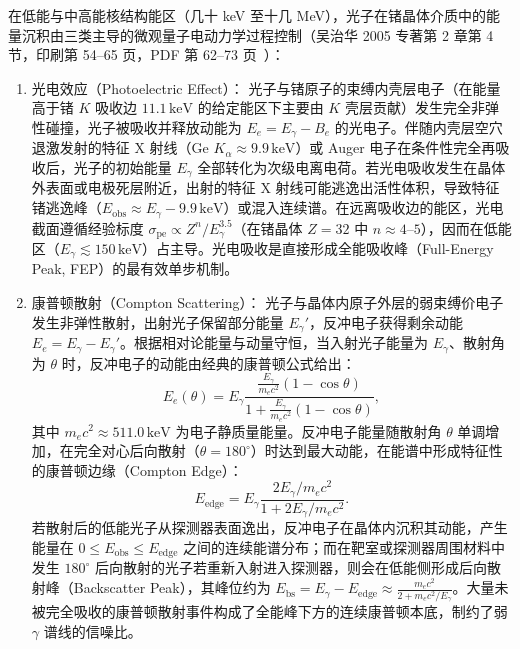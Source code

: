 在低能与中高能核结构能区（几十 keV 至十几 MeV），光子在锗晶体介质中的能量沉积由三类主导的微观量子电动力学过程控制（吴治华 2005 专著第 2 章第 4 节，印刷第 54–65 页，PDF 第 62–73 页~\cite{book-wu-nuclear-experiment-methods}）：
\begin{enumerate}
\item 光电效应（Photoelectric Effect）：
光子与锗原子的束缚内壳层电子（在能量高于锗 $K$ 吸收边 $11.1\,\text{keV}$ 的给定能区下主要由 $K$ 壳层贡献）发生完全非弹性碰撞，光子被吸收并释放动能为 $E_e = E_\gamma - B_e$ 的光电子。伴随内壳层空穴退激发射的特征 X 射线（Ge $K_\alpha \approx 9.9\,\text{keV}$）或 Auger 电子在条件性完全再吸收后，光子的初始能量 $E_\gamma$ 全部转化为次级电离电荷。若光电吸收发生在晶体外表面或电极死层附近，出射的特征 X 射线可能逃逸出活性体积，导致特征锗逃逸峰（$E_{\mathrm{obs}} \approx E_\gamma - 9.9\,\text{keV}$）或混入连续谱。在远离吸收边的能区，光电截面遵循经验标度 $\sigma_{\mathrm{pe}} \propto Z^n / E_\gamma^{3.5}$（在锗晶体 $Z=32$ 中 $n \approx 4$–$5$），因而在低能区（$E_\gamma \lesssim 150\,\text{keV}$）占主导。光电吸收是直接形成全能吸收峰（Full-Energy Peak, FEP）的最有效单步机制。
\item 康普顿散射（Compton Scattering）：
光子与晶体内原子外层的弱束缚价电子发生非弹性散射，出射光子保留部分能量 $E_\gamma'$，反冲电子获得剩余动能 $E_e = E_\gamma - E_\gamma'$。根据相对论能量与动量守恒，当入射光子能量为 $E_\gamma$、散射角为 $\theta$ 时，反冲电子的动能由经典的康普顿公式给出：
\begin{equation}\label{eq:5-2-compton-electron}
E_e(\theta) = E_\gamma \frac{\frac{E_\gamma}{m_e c^2}(1 - \cos\theta)}{1 + \frac{E_\gamma}{m_e c^2}(1 - \cos\theta)},
\end{equation}
其中 $m_e c^2 \approx 511.0\,\text{keV}$ 为电子静质量能量。反冲电子能量随散射角 $\theta$ 单调增加，在完全对心后向散射（$\theta = 180^\circ$）时达到最大动能，在能谱中形成特征性的康普顿边缘（Compton Edge）：
\begin{equation}\label{eq:5-2-compton-edge}
E_{\mathrm{edge}} = E_\gamma \frac{2 E_\gamma / m_e c^2}{1 + 2 E_\gamma / m_e c^2}.
\end{equation}
若散射后的低能光子从探测器表面逸出，反冲电子在晶体内沉积其动能，产生能量在 $0 \le E_{\mathrm{obs}} \le E_{\mathrm{edge}}$ 之间的连续能谱分布；而在靶室或探测器周围材料中发生 $180^\circ$ 后向散射的光子若重新入射进入探测器，则会在低能侧形成后向散射峰（Backscatter Peak），其峰位约为 $E_{\mathrm{bs}} = E_\gamma - E_{\mathrm{edge}} \approx \frac{m_e c^2}{2 + m_e c^2 / E_\gamma}$。大量未被完全吸收的康普顿散射事件构成了全能峰下方的连续康普顿本底，制约了弱 $\gamma$ 谱线的信噪比。

\end{enumerate}
